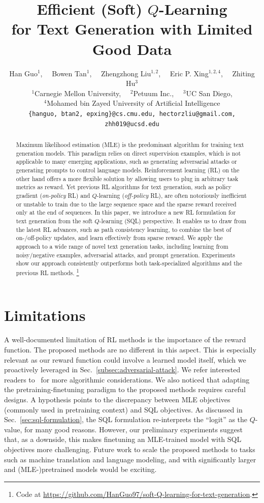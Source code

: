 \documentclass[11pt]{article}
\title{
Efficient (Soft) $Q$-Learning \\ for Text Generation
with Limited Good Data
}
\author{
Han Guo$^1$,~~
Bowen Tan$^1$,~~
Zhengzhong Liu$^{1,2}$,~~
Eric P. Xing$^{1,2,4}$,~~
Zhiting Hu$^{3}$\\
$^1$Carnegie Mellon University,~~ $^2$Petuum Inc.,~~ $^3$UC San Diego,\\
$^4$Mohamed bin Zayed University of Artificial Intelligence\\
{\small 
{\tt \{hanguo, btan2, epxing\}@cs.cmu.edu, hectorzliu@gmail.com, zhh019@ucsd.edu}
}
}
\begin{document}
\maketitle
\begin{abstract}
Maximum likelihood estimation (MLE) is the predominant algorithm for training text generation models. This paradigm relies on direct supervision examples, which is not applicable to many emerging applications, such as generating adversarial attacks or generating prompts to control language models. Reinforcement learning (RL) on the other hand offers a more flexible solution by allowing users to plug in arbitrary task metrics as reward. Yet previous RL algorithms for text generation, such as policy gradient (\emph{on-policy} RL) and $Q$-learning (\emph{off-policy} RL), are often notoriously inefficient or unstable to train due to the large sequence space and the sparse reward received only at the end of sequences. In this paper, we introduce a new RL formulation for text generation from the soft $Q$-learning (SQL) perspective. It enables us to draw from the latest RL advances, such as path consistency learning, to combine the best of on-/off-policy updates, and learn effectively from sparse reward. We apply the approach to a wide range of novel text generation tasks, including learning from noisy/negative examples, adversarial attacks, and prompt generation. Experiments show our approach consistently outperforms both task-specialized algorithms and the previous RL methods.%
\footnote{Code at \url{https://github.com/HanGuo97/soft-Q-learning-for-text-generation}.}
\end{abstract}










\section*{Limitations}



A well-documented limitation of RL methods is the importance of the reward function. The proposed methods are no different in this aspect. This is especially relevant as our reward function could involve a learned model itself, which we proactively leveraged in Sec.~\ref{subsec:adversarial-attack}. We refer interested readers to~\citet{deng2022rlprompt} for more algorithmic considerations.
We also noticed that adapting the pretraining-finetuning paradigm to the proposed methods requires careful designs. A hypothesis points to the discrepancy between MLE objectives (commonly used in pretraining context) and SQL objectives. As discussed in Sec.~\ref{sec:sql-formulation}, the SQL formulation re-interprets the ``logit'' as the $Q$-value, for many good reasons. However, our preliminary experiments suggest that, as a downside, this makes finetuning an MLE-trained model with SQL objectives more challenging.
Future work to scale the proposed methods to tasks such as machine translation and language modeling, and with significantly larger and (MLE-)pretrained models would be exciting.
\end{document}
